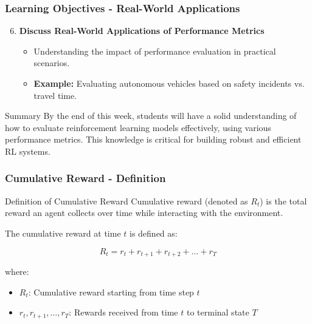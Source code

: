 \documentclass{beamer}
\begin{document}
\begin{frame}[fragile]
    \frametitle{Learning Objectives - Real-World Applications}
    \begin{enumerate}
        \setcounter{enumi}{5} %
        \item \textbf{Discuss Real-World Applications of Performance Metrics}
        \begin{itemize}
            \item Understanding the impact of performance evaluation in practical scenarios.
            \item \textbf{Example:} Evaluating autonomous vehicles based on safety incidents vs. travel time.
        \end{itemize}
    \end{enumerate}
    
    \begin{block}{Summary}
        By the end of this week, students will have a solid understanding of how to evaluate reinforcement learning models effectively, using various performance metrics. This knowledge is critical for building robust and efficient RL systems.
    \end{block}
\end{frame}

\begin{frame}[fragile]
    \frametitle{Cumulative Reward - Definition}
    \begin{block}{Definition of Cumulative Reward}
        Cumulative reward (denoted as \( R_t \)) is the total reward an agent collects over time while interacting with the environment.
    \end{block}
    
    The cumulative reward at time \( t \) is defined as:
    
    \begin{equation}
        R_t = r_t + r_{t+1} + r_{t+2} + \ldots + r_T 
    \end{equation}
    
    where:
    \begin{itemize}
        \item \( R_t \): Cumulative reward starting from time step \( t \)
        \item \( r_t, r_{t+1}, \ldots, r_T \): Rewards received from time \( t \) to terminal state \( T \)
    \end{itemize}
\end{frame}
\end{document}
